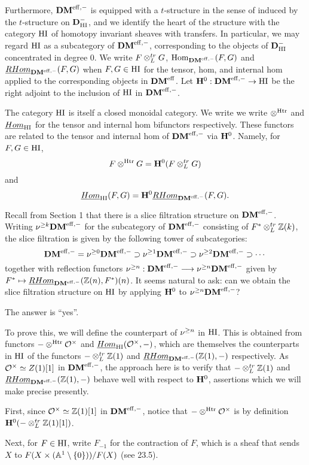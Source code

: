 Furthermore, $\DMm$ is equipped with a $t$-structure in the sense 
of \cite{BBD} induced by the $t$-structure on $\D_{\HI}^-$, and 
we identify the heart of the structure with the category $\HI$ of 
homotopy invariant sheaves with transfers. In particular, we may 
regard $\HI$ as a subcategory of $\DMm$, corresponding to the 
objects of $\D_{\HI}^-$ concentrated in degree 0. We write $F 
\tDM G$, $\homDM(F, G)$ and $\rhomDM(F, G)$ when $F, G \in \HI$ 
for the tensor, hom, and internal hom applied to the 
corresponding objects in $\DM$. Let $\H^0 : \DMm \rightarrow \HI$ 
be the right adjoint to the inclusion of $\HI$ in $\DMm$.

The category $\HI$ is itself a closed monoidal category. We write 
we write $\tHI$ and $\ihomHI$ for the tensor and internal hom 
bifunctors respectively. These functors are related to the tensor 
and internal hom of $\DMm$ via $\H^0$. Namely, for $F, G \in \HI$,
\[
F \tHI G = \H^0(F \tDM G)
\] 
and 
\[
\ihomHI(F, G) = \H^0\rhomDM(F, G).
\]

Recall from \cite{HuKa} Section 1 that there is a slice 
filtration structure on $\DMm$. Writing $\slice{\geq k}\DMm$ for 
the subcategory of $\DMm$ consisting of $F^* \tDM \Z(k)$, the 
slice filtration is given by the following tower of subcategories: 
\[
\DMm = \slice{\geq 0}\DMm \supset \slice{\geq 1}\DMm
\supset \slice{\geq 2}\DMm \supset \cdots
\]
together with reflection functors $\slice{\geq n}: \DMm 
\longrightarrow \slice{\geq n}\DMm$ given by $F^* \mapsto 
\rhomDM(\Z(n), F^*)(n)$. It seems natural to ask: can we obtain 
the slice filtration structure on $\HI$ by applying $\H^0$ to 
$\slice{\geq n} \DMm$? 

The answer is ``yes''.

To prove this, we will define the counterpart of $\slice{\geq n}$ 
in $\HI$. This is obtained from functors $-\tHI\Ox$ and 
$\ihomHI(\Ox, -)$, which are themselves the counterparts in
$\HI$ of the functors $-\tDM\Z(1)$ and $\rhomDM(\Z(1), -)$ 
respectively. As $\Ox \simeq Z(1)[1]$ in $\DMm$, the approach 
here is to verify that $-\tDM\Z(1)$ and $\rhomDM(\Z(1), -)$ 
behave well with respect to $\H^0$, assertions which we will make 
precise presently.

First, since $\Ox \simeq \Z(1)[1]$ in $\DMm$, notice that $-\tHI \Ox$
is by definition $\H^0(-\tDM \Z(1)[1])$. 

Next, for $F \in \HI$, write $F_{-1}$ for the contraction of $F$,
which is a sheaf that sends $X$ to $F(X \times (\Gm))/F(X)$
(see \cite{MVW} 23.5). 

